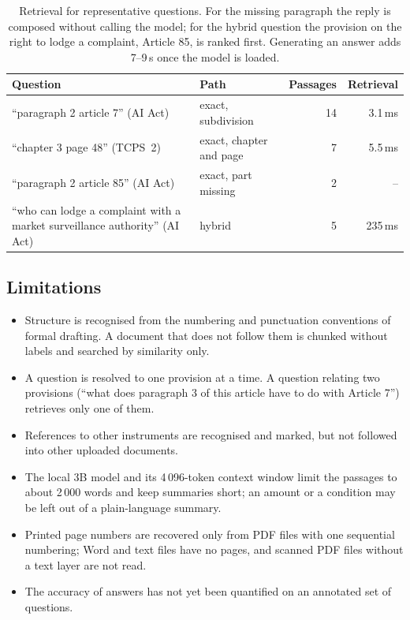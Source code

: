 \begin{table}[ht]
\centering
\small
\begin{tabularx}{\textwidth}{@{}Xlrr@{}}
\toprule
Question & Path & Passages & Retrieval \\
\midrule
``paragraph 2 article 7'' (AI Act) & exact, subdivision & 14 & 3.1\,ms \\
``chapter 3 page 48'' (TCPS~2) & exact, chapter and page & 7 & 5.5\,ms \\
``paragraph 2 article 85'' (AI Act) & exact, part missing & 2 & -- \\
``who can lodge a complaint with a market surveillance authority'' (AI Act)
  & hybrid & 5 & 235\,ms \\
\bottomrule
\end{tabularx}
\caption{Retrieval for representative questions. For the missing paragraph
the reply is composed without calling the model; for the hybrid question the
provision on the right to lodge a complaint, Article 85, is ranked first.
Generating an answer adds 7--9\,s once the model is loaded.}
\label{tab:measured}
\end{table}

\subsection{Limitations}

\begin{itemize}
  \item Structure is recognised from the numbering and punctuation
  conventions of formal drafting. A document that does not follow them is
  chunked without labels and searched by similarity only.
  \item A question is resolved to one provision at a time. A question relating
  two provisions (``what does paragraph 3 of this article have to do with
  Article 7'') retrieves only one of them.
  \item References to other instruments are recognised and marked, but not
  followed into other uploaded documents.
  \item The local 3B model and its 4\,096-token context window limit the
  passages to about 2\,000 words and keep summaries short; an amount or a
  condition may be left out of a plain-language summary.
  \item Printed page numbers are recovered only from PDF files with one
  sequential numbering; Word and text files have no pages, and scanned PDF
  files without a text layer are not read.
  \item The accuracy of answers has not yet been quantified on an annotated
  set of questions.
\end{itemize}

